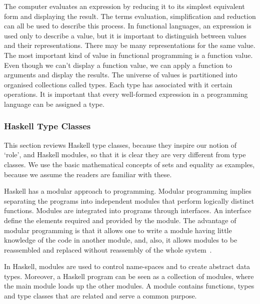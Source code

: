 \documentclass[a4paper,12pt,oneside,fleqn]{book} %
\begin{document}
The computer evaluates an expression by reducing it to its simplest
equivalent form and displaying the result. The terms evaluation,
simplification and reduction can all be used to describe this
process. In functional languages, an expression is used only to describe a
value, but it is important to distinguish between values and their
representations. There may be many representations for the same value. The
most important kind of value in functional programming is a function value.
Even though we can't display a function value, we can apply a function to
arguments and display the results. The universe of values is partitioned
into organised collections called types. Each type has associated with it
certain operations. It is important that every well-formed expression in a
programming language can be assigned a type.~\cite{}

\subsubsection{Haskell Type Classes} %

This section reviews Haskell type classes, because they inspire our notion
of `role', and Haskell modules, so that it is clear they are very different
from type classes. We use the basic mathematical concepts of sets and
equality as examples, because we assume the readers are familiar with these.


Haskell has a modular approach to programming. Modular programming implies
separating the programs into independent modules that perform logically
distinct functions. Modules are integrated into programs through
interfaces. An interface define the elements required and provided by the
module. The advantage of modular programming is that it allows one to write
a module having little knowledge of the code in another module, and, also,
it allows modules to be reassembled and replaced without reassembly of the
whole system~\cite{DBLP:journals/cacm/Parnas72a}.

In Haskell, modules are used to control name-spaces and to create abstract
data types. Moreover, a Haskell program can be seen as a collection of
modules, where the main module loads up the other modules. A module
contains functions, types and type classes that are related and serve a
common purpose.
\end{document}
